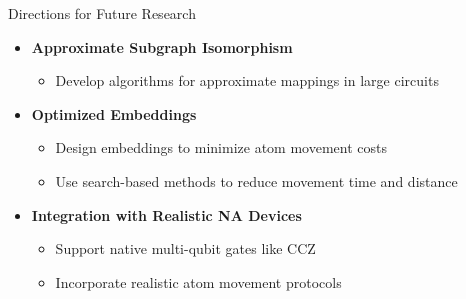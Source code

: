 \documentclass{beamer}
\begin{document}
\begin{frame}{Directions for Future Research}
  \begin{itemize}
    \item \textbf{Approximate Subgraph Isomorphism}
      \begin{itemize}
        \item Develop algorithms for approximate mappings in large circuits
      \end{itemize}
    \item \textbf{Optimized Embeddings}
      \begin{itemize}
        \item Design embeddings to minimize atom movement costs
        \item Use search-based methods to reduce movement time and distance
      \end{itemize}
    \item \textbf{Integration with Realistic NA Devices}
      \begin{itemize}
        \item Support native multi-qubit gates like CCZ
        \item Incorporate realistic atom movement protocols
      \end{itemize}
  \end{itemize}
\end{frame}
\end{document}
